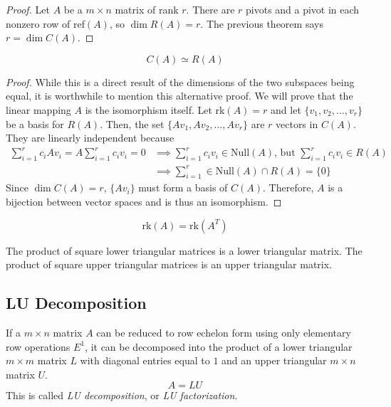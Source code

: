 \documentclass{article}
\begin{document}
    \begin{proof}
    Let $A$ be a $m \times n$ matrix of rank $r$. There are $r$ pivots and a pivot in each nonzero row of ref$(A)$, so $\dim R(A) = r$. The previous theorem says $r = \dim C(A)$. 
    \end{proof}

    \begin{corollary}
    \[C(A) \simeq R(A)\]
    \end{corollary}

    \begin{proof}
    While this is a direct result of the dimensions of the two subspaces being equal, it is worthwhile to mention this alternative proof. We will prove that the linear mapping $A$ is the isomorphism itself. Let rk$(A) = r$ and let $\{ v_1, v_2, ..., v_r\}$ be a basis for $R(A)$. Then, the set $\{ A v_1, A v_2, ..., A v_r\}$ are $r$ vectors in $C(A)$. They are linearly independent because 
    \begin{align*}
        \sum_{i = 1}^r c_i A v_i = A \sum_{i=1}^r c_i v_i = 0 & \implies \sum_{i=1}^r c_i v_i \in \text{Null}(A) \text{, but } \sum_{i=1}^r c_i v_i \in R(A) \\
        & \implies \sum_{i=1}^r \in \text{Null}(A) \cap R(A) = \{0\}
    \end{align*} 
    Since $\dim C(A) = r$, $\{A v_i\}$ must form a basis of $C(A)$. Therefore, $A$ is a bijection between vector spaces and is thus an isomorphism. 
    \end{proof}

    \begin{corollary}
    \[\text{rk}(A) = \text{rk}(A^T)\]
    \end{corollary}

    \begin{proposition}
    The product of square lower triangular matrices is a lower triangular matrix. The product of square upper triangular matrices is an upper triangular matrix. 
    \end{proposition}

  \subsection{LU Decomposition}

    \begin{theorem}
    If a $m \times n$ matrix $A$ can be reduced to row echelon form using only elementary row operations $E^1$, it can be decomposed into the product of a lower triangular $m \times m$ matrix $L$ with diagonal entries equal to $1$ and an upper triangular $m \times n$ matrix $U$. 
    \[A = L U\]
    This is called \textit{LU decomposition}, or \textit{LU factorization}. 
    \end{theorem}
\end{document}
